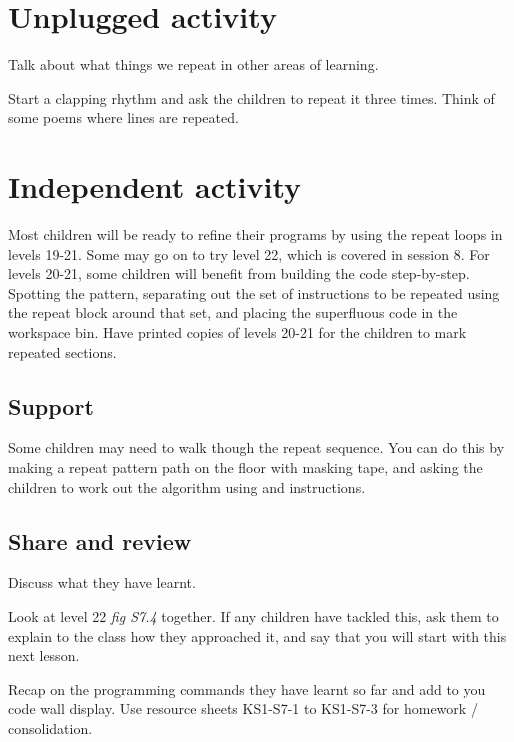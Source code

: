 \documentclass{../../../lessonplan}
\begin{document}
\begin{lessonplan}
\section*{Unplugged activity}

Talk about what things we repeat in other areas of learning.

Start a clapping rhythm and ask the children to repeat it three times.
Think of some poems where lines are repeated.

\section*{Independent activity}

Most children will be ready to refine their programs by using the repeat loops in levels 19-21.
Some may go on to try level 22, which is covered in session 8.
For levels 20-21, some children will benefit from building the code step-by-step.
Spotting the pattern, separating out the set of instructions to be repeated using the repeat block around that set, and placing the superfluous code in the workspace bin.
Have printed copies of levels 20-21 for the children to mark repeated sections.

\subsection*{Support}

Some children may need to walk though the repeat sequence.
You can do this by making a repeat pattern path on the floor with masking tape, and asking the children to work out the algorithm using  and  instructions.

\subsection*{Share and review}

Discuss what they have learnt.


Look at level 22 \textit{fig S7.4} together.
If any children have tackled this, ask them to explain to the class how they approached it, and say that you will start with this next lesson.


Recap on the programming commands they have learnt so far and add  to you code wall display.
Use resource sheets KS1-S7-1 to KS1-S7-3 for homework / consolidation.

\end{lessonplan}
\end{document}
